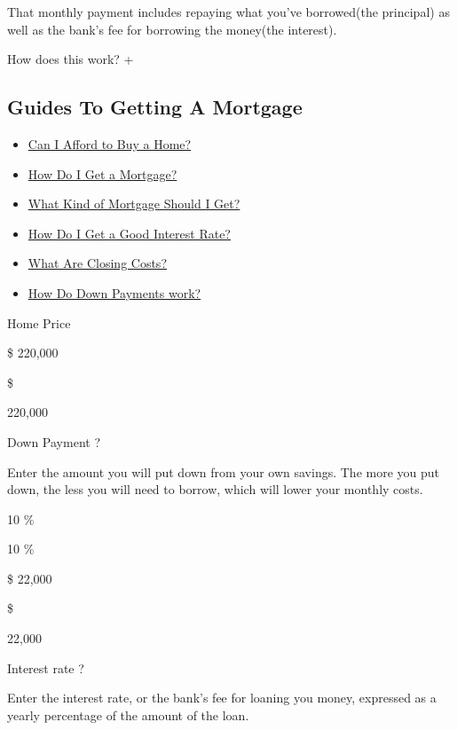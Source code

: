 That monthly payment includes repaying what you've borrowed(the
principal) as well as the bank's fee for borrowing the money(the
interest).

How does this work? +

\hypertarget{guides-to-getting-a-mortgage}{%
\subsection{Guides To Getting A
Mortgage}\label{guides-to-getting-a-mortgage}}

\begin{itemize}
\tightlist
\item
  \href{https://www.nytimes3xbfgragh.onion/interactive/2017/realestate/Can-I-Afford-to-Buy-a-Home.html}{Can
  I Afford to Buy a Home?}
\item
  \href{https://www.nytimes3xbfgragh.onion/interactive/2017/realestate/How-Do-I-Get-a-Mortgage.html}{How
  Do I Get a Mortgage?}
\item
  \href{https://www.nytimes3xbfgragh.onion/interactive/2017/realestate/What-Kind-of-Mortgage-Should-I-Get.html}{What
  Kind of Mortgage Should I Get?}
\item
  \href{https://www.nytimes3xbfgragh.onion/interactive/2017/realestate/How-Do-I-Get-a-Good-Interest-Rate.html}{How
  Do I Get a Good Interest Rate?}
\item
  \href{https://www.nytimes3xbfgragh.onion/interactive/2017/realestate/what-are-closing-costs.html}{What
  Are Closing Costs?}
\item
  \href{https://www.nytimes3xbfgragh.onion/interactive/2017/realestate/Down-payments.html}{How
  Do Down Payments work?}
\end{itemize}

Home Price

\$ 220,000

 \$

 220,000

Down Payment ?

Enter the amount you will put down from your own savings. The more you
put down, the less you will need to borrow, which will lower your
monthly costs.

10 \%

 10 \%

\$ 22,000

 \$

 22,000

Interest rate ?

Enter the interest rate, or the bank's fee for loaning you money,
expressed as a yearly percentage of the amount of the loan.

